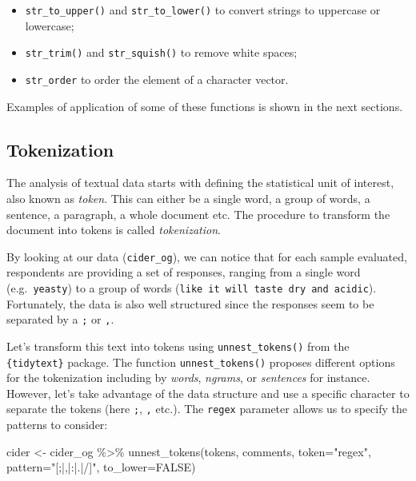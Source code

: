 \documentclass[
]{krantz}
\makeatletter
\newenvironment{Shaded}{\begin{snugshade}}{\end{snugshade}}
\newcommand{\AttributeTok}[1]{\textcolor[rgb]{0.61,0.61,0.61}{#1}}
\newcommand{\ConstantTok}[1]{\textcolor[rgb]{0,0,0}{#1}}
\newcommand{\FunctionTok}[1]{\textcolor[rgb]{0,0,0}{#1}}
\newcommand{\NormalTok}[1]{#1}
\newcommand{\OtherTok}[1]{\textcolor[rgb]{0.37,0.37,0.37}{#1}}
\newcommand{\SpecialCharTok}[1]{\textcolor[rgb]{0,0,0}{#1}}
\newcommand{\StringTok}[1]{\textcolor[rgb]{0.5,0.5,0.5}{#1}}
\providecommand{\tightlist}{%
  \setlength{\itemsep}{0pt}\setlength{\parskip}{0pt}}
\newenvironment{kframe}{%
\medskip{}
\setlength{\fboxsep}{.8em}
 \def\at@end@of@kframe{}%
 \ifinner\ifhmode%
  \def\at@end@of@kframe{\end{minipage}}%
  \begin{minipage}{\columnwidth}%
 \fi\fi%
 \def\FrameCommand##1{\hskip\@totalleftmargin \hskip-\fboxsep
 \colorbox{shadecolor}{##1}\hskip-\fboxsep
     \hskip-\linewidth \hskip-\@totalleftmargin \hskip\columnwidth}%
 \MakeFramed {\advance\hsize-\width
   \@totalleftmargin\z@ \linewidth\hsize
   \@setminipage}}%
 {\par\unskip\endMakeFramed%
 \at@end@of@kframe}
\renewenvironment{Shaded}{\begin{kframe}}{\end{kframe}}
\makeatother
\begin{document}
\begin{itemize}
\tightlist
\item
  \texttt{str\_to\_upper()} and \texttt{str\_to\_lower()} to convert strings to uppercase or lowercase;
\item
  \texttt{str\_trim()} and \texttt{str\_squish()} to remove white spaces;
\item
  \texttt{str\_order} to order the element of a character vector.
\end{itemize}

Examples of application of some of these functions is shown in the next sections.

\hypertarget{tokenization}{%
\subsection{Tokenization}\label{tokenization}}

The analysis of textual data starts with defining the statistical unit of interest, also known as \emph{token}. This can either be a single word, a group of words, a sentence, a paragraph, a whole document etc. The procedure to transform the document into tokens is called \emph{tokenization}.

By looking at our data (\texttt{cider\_og}), we can notice that for each sample evaluated, respondents are providing a set of responses, ranging from a single word (e.g.~\texttt{yeasty}) to a group of words (\texttt{like\ it\ will\ taste\ dry\ and\ acidic}). Fortunately, the data is also well structured since the responses seem to be separated by a \texttt{;} or \texttt{,}.

Let's transform this text into tokens using \texttt{unnest\_tokens()} from the \texttt{\{tidytext\}} package. The function \texttt{unnest\_tokens()} proposes different options for the tokenization including by \emph{words}, \emph{ngrams}, or \emph{sentences} for instance. However, let's take advantage of the data structure and use a specific character to separate the tokens (here \texttt{;}, \texttt{,} etc.). The \texttt{regex} parameter allows us to specify the patterns to consider:

\begin{Shaded}
\begin{Highlighting}[]
\NormalTok{cider }\OtherTok{\textless{}{-}}\NormalTok{ cider\_og }\SpecialCharTok{\%\textgreater{}\%} 
  \FunctionTok{unnest\_tokens}\NormalTok{(tokens, comments, }\AttributeTok{token=}\StringTok{"regex"}\NormalTok{, }
                \AttributeTok{pattern=}\StringTok{"[;|,|:|.|/]"}\NormalTok{, }\AttributeTok{to\_lower=}\ConstantTok{FALSE}\NormalTok{)}
\end{Highlighting}
\end{Shaded}
\end{document}
